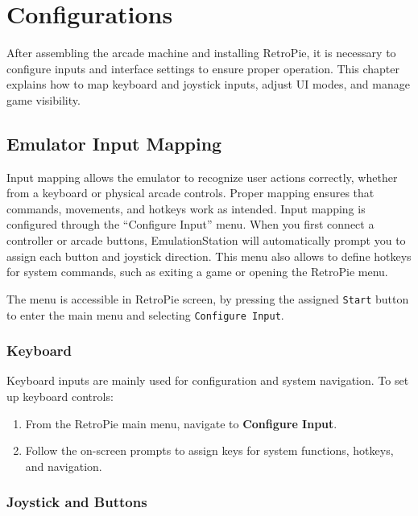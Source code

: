 \chapter{Configurations}
\label{cha:configurations}

After assembling the arcade machine and installing RetroPie, it is necessary to configure inputs and interface settings to ensure proper operation. This chapter explains how to map keyboard and joystick inputs, adjust UI modes, and manage game visibility.

\section{Emulator Input Mapping}
\label{sec:input_mapping}

Input mapping allows the emulator to recognize user actions correctly, whether from a keyboard or physical arcade controls. 
Proper mapping ensures that commands, movements, and hotkeys work as intended. Input mapping is configured through the “Configure Input” menu. 
When you first connect a controller or arcade buttons, EmulationStation will automatically prompt you to assign each button and joystick direction. 
This menu also allows to define hotkeys for system commands, such as exiting a game or opening the RetroPie menu. 

The menu is accessible in RetroPie screen, by pressing the assigned \texttt{Start} button to enter the main menu and selecting \texttt{Configure Input}.
\subsection{Keyboard}
\label{subsec:keyboard}

Keyboard inputs are mainly used for configuration and system navigation. To set up keyboard controls:

\begin{enumerate}
    \item From the RetroPie main menu, navigate to \textbf{Configure Input}.
    \item Follow the on-screen prompts to assign keys for system functions, hotkeys, and navigation.
\end{enumerate}

\subsection{Joystick and Buttons}
\label{subsec:joystick_buttons}

